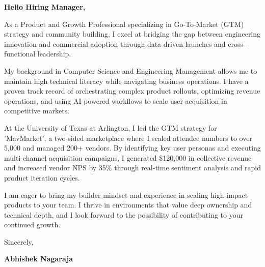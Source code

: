 \documentclass[11pt,letterpaper]{article} %
\begin{document}
\vspace{1.5em}

\textbf{Hello Hiring Manager,}

As a Product and Growth Professional specializing in Go-To-Market (GTM) strategy and community building, I excel at bridging the gap between engineering innovation and commercial adoption through data-driven launches and cross-functional leadership.

My background in Computer Science and Engineering Management allows me to maintain high technical literacy while navigating business operations. I have a proven track record of orchestrating complex product rollouts, optimizing revenue operations, and using AI-powered workflows to scale user acquisition in competitive markets.

At the University of Texas at Arlington, I led the GTM strategy for 'MavMarket', a two-sided marketplace where I scaled attendee numbers to over 5,000 and managed 200+ vendors. By identifying key user personas and executing multi-channel acquisition campaigns, I generated \$120,000 in collective revenue and increased vendor NPS by 35\% through real-time sentiment analysis and rapid product iteration cycles.

I am eager to bring my builder mindset and experience in scaling high-impact products to your team. I thrive in environments that value deep ownership and technical depth, and I look forward to the possibility of contributing to your continued growth.

\vspace{1.5em}
Sincerely,

\vspace{1.2em} %
\textbf{Abhishek Nagaraja}
\end{document}
